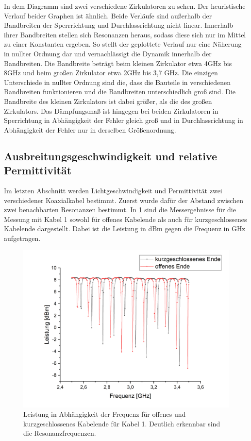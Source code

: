 In dem Diagramm sind zwei verschiedene Zirkulatoren zu sehen. Der heuristische Verlauf beider Graphen ist ähnlich. Beide Verläufe sind außerhalb der Bandbreiten der Sperrrichtung und Durchlassrichtung nicht linear. Innerhalb ihrer Bandbreiten stellen sich Resonanzen heraus, sodass diese sich nur im Mittel zu einer Konstanten ergeben. So stellt der geplottete Verlauf nur eine Näherung in nullter Ordnung dar und vernachlässigt die Dynamik innerhalb der Bandbreiten.
Die Bandbreite beträgt beim kleinen Zirkulator etwa 4GHz bis 8GHz und beim großen Zirkulator etwa 2GHz bis 3,7 GHz. Die einzigen Unterschiede in nullter Ordnung sind die, dass die Bauteile in verschiedenen Bandbreiten funktionieren und die Bandbreiten unterschiedlich groß sind. Die Bandbreite des kleinen Zirkulators ist dabei größer, als die des großen Zirkulators. Das Dämpfungsmaß ist hingegen bei beiden Zirkulatoren in Sperrichtung in Abhängigkeit der Fehler gleich groß und in Durchlassrichtung in Abhängigkeit der Fehler nur in derselben Größenordnung.

\subsection{Ausbreitungsgeschwindigkeit und relative Permittivität}
Im letzten Abschnitt werden Lichtgeschwindigkeit und Permittivität zwei verschiedener Koaxialkabel bestimmt. Zuerst wurde dafür der Abstand zwischen zwei benachbarten Resonanzen bestimmt. In \cref{gleich} sind die Messergebnisse für die Messung mit Kabel 1 sowohl für offenes Kabelende als auch für kurzgeschlossenes Kabelende dargestellt. Dabei ist die Leistung in dBm gegen die Frequenz in GHz aufgetragen.

\begin{figure}[h]
	\centering
	\includegraphics[scale=0.6]{gleiches_Kabel.png}
	\caption{Leistung in Abhängigkeit der Frequenz für offenes und kurzgeschlossenes Kabelende für Kabel 1. Deutlich erkennbar sind die Resonanzfrequenzen.}
	\label{gleich}
\end{figure}

